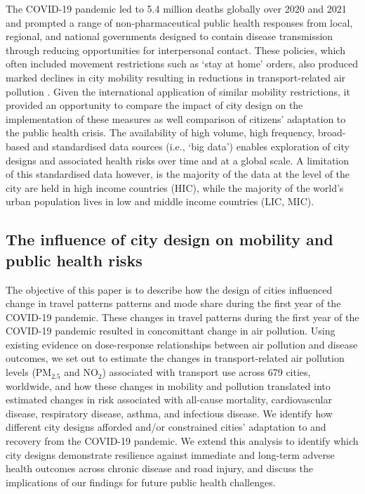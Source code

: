 \documentclass[preprint,10pt]{elsarticle} %
\begin{document}
The COVID-19 pandemic led to 5.4 million deaths globally over 2020 and 2021 \cite{Taylor2022} and prompted a range of non-pharmaceutical public health responses from local, regional, and national governments\cite{Hunter2023LPH} designed to contain disease transmission through reducing opportunities for interpersonal contact. These policies, which often included movement restrictions such as `stay at home' orders, also produced marked declines in city mobility resulting in reductions in transport-related air pollution \cite{Forster2020,He2020,LeQuere2020,Venter2020,thompson2022modelling}. Given the international application of similar mobility restrictions, it provided an opportunity to compare the impact of city design on the implementation of these measures as well comparison of citizens' adaptation to the public health crisis. The availability of high volume, high frequency, broad-based and standardised data sources (i.e., `big data') enables exploration of city designs and associated health risks over time and at a global scale. A limitation of this standardised data however, is the majority of the data at the level of the city are held in high income countries (HIC), while the majority of the world's urban population lives in low and middle income countries (LIC, MIC)\cite{Smit2021}.

%

\subsection*{The influence of city design on mobility and public health risks}
The objective of this paper is to describe how the design of cities influenced change in travel patterns patterns and mode share during the first year of the COVID-19 pandemic. These changes in travel patterns during the first year of the COVID-19 pandemic resulted in concomittant change in air pollution. Using existing evidence on dose-response relationships between air pollution and disease outcomes, we set out to estimate the changes in transport-related air pollution levels (PM$_{2.5}$ and NO$_{2}$) associated with transport use across 679 cities, worldwide, and how these changes in mobility and pollution translated into estimated changes in risk associated with all-cause mortality, cardiovascular disease, respiratory disease, asthma, and infectious disease. We identify how different city designs afforded and/or constrained cities' adaptation to and recovery from the COVID-19 pandemic. We extend this analysis to identify which city designs demonstrate  resilience against immediate and long-term adverse health outcomes across chronic disease and road injury, and discuss the implications of our findings for future public health challenges.
\end{document}
